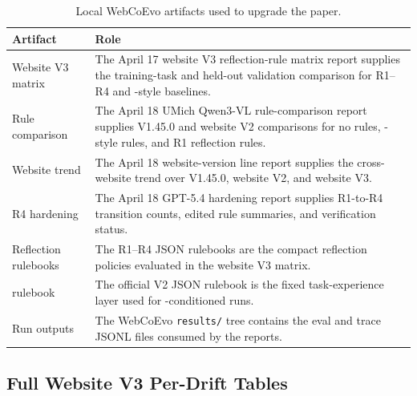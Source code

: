 \begin{table}[!htbp]
\centering
\caption{Local WebCoEvo artifacts used to upgrade the paper.}
\label{tab:artifact_paths}
\small
\begin{tabular}{p{3.1cm}p{10.1cm}}
\toprule
Artifact & Role \\
\midrule
Website V3 matrix & The April 17 website V3 reflection-rule matrix report supplies the training-task and held-out validation comparison for R1--R4 and \expel{}-style baselines. \\
Rule comparison & The April 18 UMich Qwen3-VL rule-comparison report supplies \linkding{} V1.45.0 and website V2 comparisons for no rules, \expel{}-style rules, and R1 reflection rules. \\
Website trend & The April 18 website-version line report supplies the cross-website trend over \linkding{} V1.45.0, website V2, and website V3. \\
R4 hardening & The April 18 GPT-5.4 hardening report supplies R1-to-R4 transition counts, edited rule summaries, and verification status. \\
Reflection rulebooks & The R1--R4 JSON rulebooks are the compact reflection policies evaluated in the website V3 matrix. \\
\expel{} rulebook & The official V2 \expel{} JSON rulebook is the fixed task-experience layer used for \expel{}-conditioned runs. \\
Run outputs & The WebCoEvo \texttt{results/} tree contains the eval and trace JSONL files consumed by the reports. \\
\bottomrule
\end{tabular}
\end{table}

\FloatBarrier

\subsection{Full Website V3 Per-Drift Tables}

